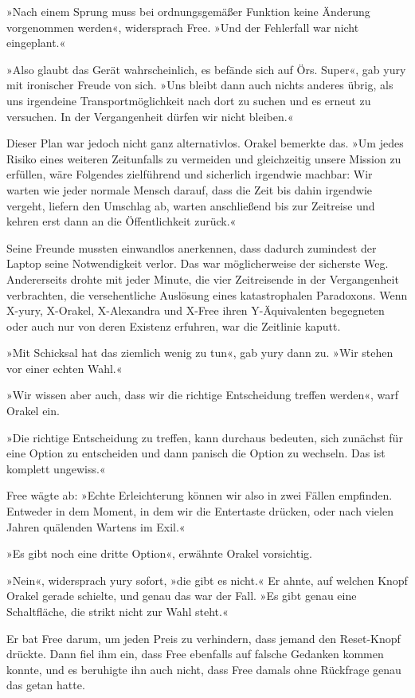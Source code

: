 »Nach einem Sprung muss bei ordnungsgemäßer Funktion keine Änderung vorgenommen werden«, widersprach Free. »Und der Fehlerfall war nicht eingeplant.«

»Also glaubt das Gerät wahrscheinlich, es befände sich auf Örs. Super«, gab yury mit ironischer Freude von sich. »Uns bleibt dann auch nichts anderes übrig, als uns irgendeine Transportmöglichkeit nach dort zu suchen und es erneut zu versuchen. In der Vergangenheit dürfen wir nicht bleiben.«

Dieser Plan war jedoch nicht ganz alternativlos. Orakel bemerkte das. »Um jedes Risiko eines weiteren Zeitunfalls zu vermeiden und gleichzeitig unsere Mission zu erfüllen, wäre Folgendes zielführend und sicherlich irgendwie machbar: Wir warten wie jeder normale Mensch darauf, dass die Zeit bis dahin irgendwie vergeht, liefern den Umschlag ab, warten anschließend bis zur Zeitreise und kehren erst dann an die Öffentlichkeit zurück.«

Seine Freunde mussten einwandlos anerkennen, dass dadurch zumindest der Laptop seine Notwendigkeit verlor. Das war möglicherweise der sicherste Weg. Andererseits drohte mit jeder Minute, die vier Zeitreisende in der Vergangenheit verbrachten, die versehentliche Auslösung eines katastrophalen Paradoxons. Wenn X-yury, X-Orakel, X-Alexandra und X-Free ihren Y-Äquivalenten begegneten oder auch nur von deren Existenz erfuhren, war die Zeitlinie kaputt.

»Mit Schicksal hat das ziemlich wenig zu tun«, gab yury dann zu. »Wir stehen vor einer echten Wahl.«

»Wir wissen aber auch, dass wir die richtige Entscheidung treffen werden«, warf Orakel ein.

»Die richtige Entscheidung zu treffen, kann durchaus bedeuten, sich zunächst für eine Option zu entscheiden und dann panisch die Option zu wechseln. Das ist komplett ungewiss.«

Free wägte ab: »Echte Erleichterung können wir also in zwei Fällen empfinden. Entweder in dem Moment, in dem wir die Entertaste drücken, oder nach vielen Jahren quälenden Wartens im Exil.«

»Es gibt noch eine dritte Option«, erwähnte Orakel vorsichtig.

»Nein«, widersprach yury sofort, »die gibt es nicht.« Er ahnte, auf welchen Knopf Orakel gerade schielte, und genau das war der Fall. »Es gibt genau eine Schaltfläche, die strikt nicht zur Wahl steht.«

Er bat Free darum, um jeden Preis zu verhindern, dass jemand den Reset-Knopf drückte. Dann fiel ihm ein, dass Free ebenfalls auf falsche Gedanken kommen konnte, und es beruhigte ihn auch nicht, dass Free damals ohne Rückfrage genau das getan hatte.

